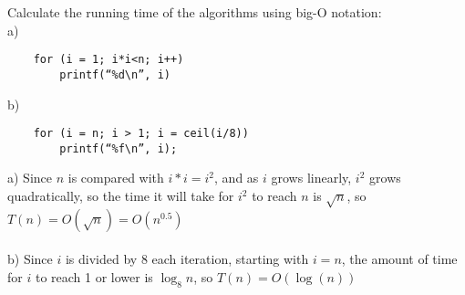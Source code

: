 \documentclass[12pt]{article}
\newenvironment{problem}[2][Problem]{\begin{trivlist}
\item[\hskip \labelsep {\bfseries #1}\hskip \labelsep {\bfseries #2.}]}{\end{trivlist}}
\begin{document}
\begin{problem}{3}
    Calculate the running time of the algorithms using big-O notation:\\
    a) \begin{verbatim}
    for (i = 1; i*i<n; i++)
        printf(“%d\n”, i)
    \end{verbatim}
    b) \begin{verbatim}
    for (i = n; i > 1; i = ceil(i/8))
        printf(“%f\n”, i);
    \end{verbatim}
    a) Since $n$ is compared with $i*i = i^2$, and as $i$ grows linearly, $i^2$ grows quadratically, so the time it will take for $i^2$ to reach $n$ is $\sqrt{n}$, so $T(n) = O(\sqrt{n}) = O(n^{0.5})$\\\\
    b) Since $i$ is divided by 8 each iteration, starting with $i = n$, the amount of time for $i$ to reach 1 or lower is $\log_8{n}$, so $T(n) = O(\log(n))$
\end{problem}

 
\end{document}
